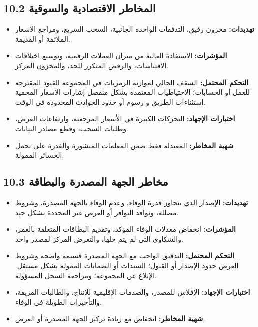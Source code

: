 \documentclass[11pt]{article}
\begin{document}
\subsection*{10.2 المخاطر الاقتصادية والسوقية}

\begin{itemize}[leftmargin=*]
\item \textbf{تهديدات:} مخزون رقيق، التدفقات الواحدة الجانبية، السحب السريع، ومراجع الأسعار الملائمة أو القديمة.
\item \textbf{المؤشرات:} الاستفادة العالية من ميزان العملات الرقمية، وتوسيع اختلافات الاقتباسات، والرفض المتكرر للحد، والمخزون المركز.
\item \textbf{التحكم المحتمل:} السقف الحالي لموازنة الرمزيات في المجموعة القيود المقترحة للعمل أو الحسابات؛ الاحتياطيات المعتمدة بشكل منفصل إشارات الأسعار المحمية استثناءات الطريق و رسوم أو حدود الحوادث المحدودة في الوقت.
\item \textbf{اختبارات الإجهاد:} التحركات الكبيرة في الأسعار المرجعية، وارتفاعات العرض، وطلبات السحب، وقطع مصادر البيانات.
\item \textbf{شهية المخاطر:} المعتدلة فقط ضمن المعلمات المنشورة والقدرة على تحمل الخسائر الممولة.
\end{itemize}
\subsection*{10.3 مخاطر الجهة المصدرة والبطاقة}

\begin{itemize}[leftmargin=*]
\item \textbf{تهديدات:} الإصدار الذي يتجاوز قدرة الوفاء، وعدم الوفاء بالجهة المصدرة، وشروط مضللة، ونوافذ التوافر أو العرض غير المحددة بشكل جيد.
\item \textbf{المؤشرات:} انخفاض معدلات الوفاء المؤكد، وتقديم البطاقات المتعلقة بالعمر، والشكاوى التي لم يتم حلها، والتعرض المركز لمصدر واحد.
\item \textbf{التحكم المحتمل:} التدقيق الواجب مع الجهة المصدرة قسيمة واضحة وشروط العرض حدود الإصدار أو القبول؛ السندات أو الضمانات الممولة بشكل مستقل. الإبلاغ عن المجموعة؛ ومراجعة السجل المسؤولة.
\item \textbf{اختبارات الإجهاد:} الإفلاس للمصدر، والصدمات الإقليمية للإنتاج، والطالبات المزيفة، والتأخيرات الطويلة في الوفاء.
\item \textbf{شهية المخاطر:} انخفاض مع زيادة تركيز الجهة المصدرة أو العرض.
\end{itemize}
\end{document}
